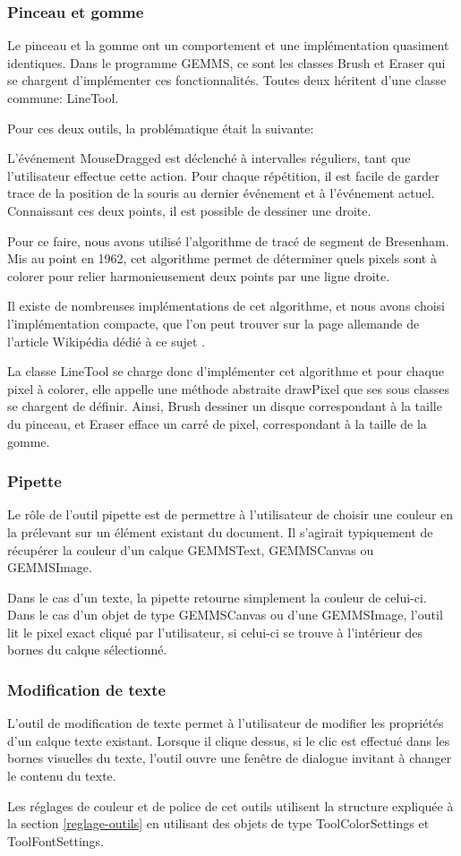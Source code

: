 \subsubsection{Pinceau et gomme}
Le pinceau et la gomme ont un comportement et une implémentation quasiment identiques. Dans le programme GEMMS, ce sont les classes Brush et Eraser qui se chargent d'implémenter ces fonctionnalités. Toutes deux héritent d'une classe commune: LineTool.
\par
Pour ces deux outils, la problématique était la suivante:
\par
L'événement MouseDragged est déclenché à intervalles réguliers, tant que l'utilisateur effectue cette action. Pour chaque répétition, il est facile de garder trace de la position de la souris au dernier événement et à l'événement actuel. Connaissant ces deux points, il est possible de dessiner une droite.
\par
Pour ce faire, nous avons utilisé l'algorithme de tracé de segment de Bresenham. Mis au point en 1962, cet algorithme permet de déterminer quels pixels sont à colorer pour relier harmonieusement deux points par une ligne droite.
\par
Il existe de nombreuses implémentations de cet algorithme, et nous avons choisi l'implémentation compacte, que l'on peut trouver sur la page allemande de l'article Wikipédia dédié à ce sujet \cite{Bresenham}.
\par
La classe LineTool se charge donc d'implémenter cet algorithme et pour chaque pixel à colorer, elle appelle une méthode abstraite drawPixel que ses sous classes se chargent de définir. Ainsi, Brush dessiner un disque correspondant à la taille du pinceau, et Eraser efface un carré de pixel, correspondant à la taille de la gomme.
\subsubsection{Pipette}
Le rôle de l'outil pipette est de permettre à l'utilisateur de choisir une couleur en la prélevant sur un élément existant du document. Il s'agirait typiquement de récupérer la couleur d'un calque GEMMSText, GEMMSCanvas ou GEMMSImage.
\par
Dans le cas d'un texte, la pipette retourne simplement la couleur de celui-ci. Dans le cas d'un objet de type GEMMSCanvas ou d'une GEMMSImage, l'outil lit le pixel exact cliqué par l'utilisateur, si celui-ci se trouve à l'intérieur des bornes du calque sélectionné.
\subsubsection{Modification de texte}
L'outil de modification de texte permet à l'utilisateur de modifier les propriétés d'un calque texte existant. Lorsque il clique dessus, si le clic est effectué dans les bornes visuelles du texte, l'outil ouvre une fenêtre de dialogue invitant à changer le contenu du texte.
\par
Les réglages de couleur et de police de cet outils utilisent la structure expliquée à la section \ref{reglage-outils} en utilisant des objets de type ToolColorSettings et ToolFontSettings.
